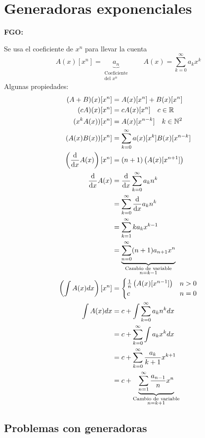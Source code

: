 \documentclass[../main.tex]{subfiles}
\begin{document}
\chapter{Generadoras exponenciales}%

\thispagestyle{fancy}

\textbf{FGO:}

Se usa el coeficiente de $x^n$ para llevar la cuenta
\[
	A(x)[x^n]=
	\underbrace
	{
		a_n
	}_
	{
		\substack
		{
			\text{Coeficiente}\\
			\text{del $x^n$}
		}
	}
	\qquad A(x)=\sum_{k=0}^\infty a_kx^k
\]
Algunas propiedades:
\begin{align*}
	(A+B)(x)[x^n] &= A(x)[x^n]+B(x)[x^n]\\
	(cA)(x)[x^n] &= cA(x)[x^n]\quad c \in \mathbb{R}\\
	(x^kA(x))[x^n] &= A(x)[x^{n-k}]\quad k\in\mathbb{N}^2\\
	(A(x)B(x))[x^n] &=
	\sum_{k=0}^\infty
	a(x)[x^k]B(x)[x^{n-k}]\\
	\left(
		\dv{}{x}A(x)
	\right)
	[x^n] &= (n+1)
	\left(
		A(x)[x^{n+1}]
	\right)\\
	\dv{}{x}A(x) &= \dv{}{x} \sum_{k=0}^\infty a_kn^k\\
	&= \sum_{k=0}^\infty \dv{}{x}a_kn^k\\
	&= \sum_{k=1}^\infty
	ka_kx^{k-1}\\
	&=
	\underbrace
	{
		\sum_{n=0}^\infty
		(n+1)a_{n+1}x^n
	}_
	{
		\substack
		{
			\text{Cambio de variable}\\
			n=k-1
		}
	}
	\\
	\left(
		\int A(x)dx
	\right)
	[x^n] &=
	\begin{cases}
		\frac{1}{n}
		\left(
			A(x)[x^{n-1}]
		\right)
		&n > 0\\
		c &n=0
	\end{cases}\\
	\int A(x)dx &= c+ \int \sum_{k=0}^\infty a_kn^k dx\\
	&= c + \sum_{k=0}^\infty \int a_kx^kdx\\
	&= c + \sum_{k=0}^\infty \frac{a_k}{k+1} x^{k+1}\\
	&= c +
	\underbrace
	{
		\sum_{n=1}^\infty \frac{a_{n-1}}{n} x^n
	}_
	{
		\substack
		{
			\text{Cambio de variable}\\
			n=k+1
		}
	}
\end{align*}

\section{Problemas con generadoras}%
\label{sec:problemas_con_generadoras}
\end{document}
